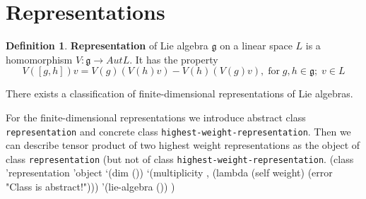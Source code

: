 \documentclass[a4paper,10pt]{article}
\theoremstyle{definition} \newtheorem{Def}{Definition}
\begin{document}
\section{Representations}
\label{sec:representations}

\begin{Def}
  {\bf Representation} of Lie algebra $\mathfrak{g}$ on a linear space $L$ is a homomorphism $V:\mathfrak{g}\to Aut L$. It has the property
  \begin{equation}
    \label{eq:3}
    V([g,h])v=V(g)(V(h)v)-V(h)(V(g)v), \;\text{for}\; g,h\in \mathfrak{g};\; v\in L
  \end{equation}
\end{Def}
There exists a classification of finite-dimensional representations of Lie algebras.

For the finite-dimensional representations we introduce abstract class {\tt{}representation} and concrete class {\tt{}highest-weight-representation}. Then we can describe  tensor product of two highest weight representations as the object of class {\tt{}representation} (but not of class {\tt{}highest-weight-representation}.
\nwenddocs{}\endmoddef
(class 'representation 'object
       `(dim ())
       `(multiplicity , (lambda (self weight)
                          (error "Class is abstract!")))
       '(lie-algebra ())
       )
\nwendcode{}\nwdocspar
\end{document}
